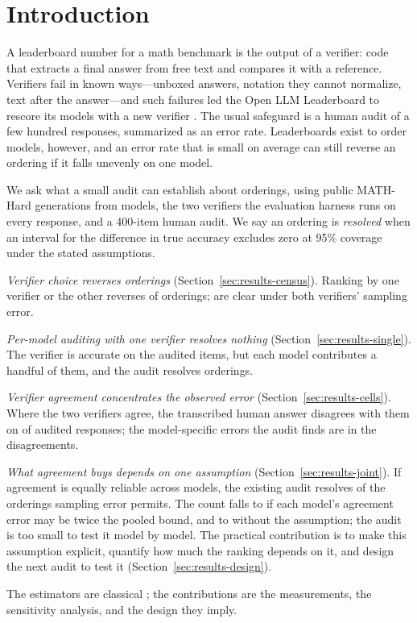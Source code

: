 \section{Introduction}
\label{sec:introduction}

A leaderboard number for a math benchmark is the output of a verifier: code
that extracts a final answer from free text and compares it with a
reference. Verifiers fail in known ways---unboxed answers, notation they
cannot normalize, text after the answer---and such failures led the Open LLM
Leaderboard to rescore its models with a new verifier
\citep{kydlicek2025fixing}. The usual safeguard is a human audit of a few
hundred responses, summarized as an error rate. Leaderboards exist to order
models, however, and an error rate that is small on average can still
reverse an ordering if it falls unevenly on one model.

We ask what a small audit can establish about orderings, using public
MATH-Hard generations from \nNModels{} models, the two verifiers the
evaluation harness runs on every response, and a 400-item human audit. We say
an ordering is \emph{resolved} when an interval for the difference in true
accuracy excludes zero at 95\% coverage under the stated assumptions.

\emph{Verifier choice reverses orderings} (Section~\ref{sec:results-census}).
Ranking by one verifier or the other reverses \nScorerFlips{} of \nNPairs{}
orderings; \nScorerFlipsSig{} are clear under both verifiers' sampling error.

\emph{Per-model auditing with one verifier resolves nothing}
(Section~\ref{sec:results-single}). The verifier is accurate on the audited
items, but each model contributes a handful of them, and the audit resolves
\nSingleComb{} orderings.

\emph{Verifier agreement concentrates the observed error}
(Section~\ref{sec:results-cells}). Where the two verifiers agree, the
transcribed human answer disagrees with them on \nConcErr{} of \nConcN{}
audited responses; the model-specific errors the audit finds are in the
disagreements.

\emph{What agreement buys depends on one assumption}
(Section~\ref{sec:results-joint}). If agreement is equally reliable across
models, the existing audit resolves \nJointComb{} of the \nCeiling{}
orderings sampling error permits. The count falls to \nHetTwo{} if each
model's agreement error may be twice the pooled bound, and to \nNoPool{}
without the assumption; the audit is too small to test it model by model.
The practical contribution is to make this assumption explicit, quantify how
much the ranking depends on it, and design the next audit to test it
(Section~\ref{sec:results-design}).

The estimators are classical \citep{neyman1938contribution,begg1983assessment};
the contributions are the measurements, the sensitivity analysis, and the
design they imply.
